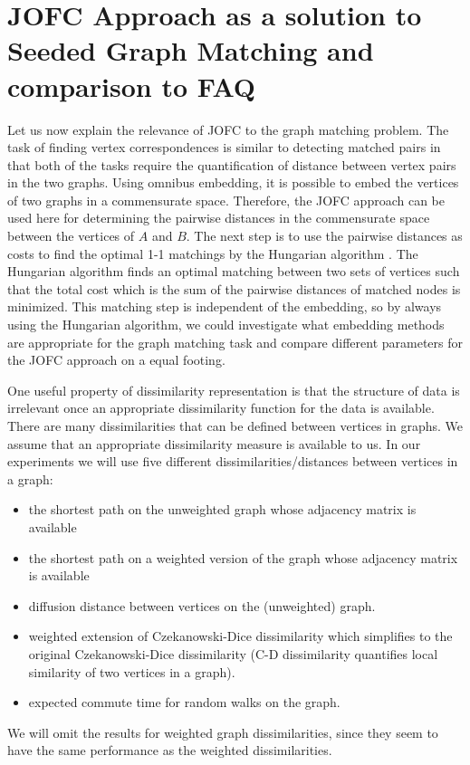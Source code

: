 \documentclass[12pt,oneside,final]{thesis}\usepackage[]{graphicx}\usepackage[]{color}
\begin{document}
\chapter{JOFC Approach as a solution to Seeded Graph Matching and comparison to FAQ}
\label{sec:sgm-jofc}


Let us now explain the relevance of JOFC to the graph matching problem. The  task of finding vertex correspondences is similar to  detecting matched pairs in that both of the tasks require the quantification of distance between vertex pairs  in the two graphs.
Using omnibus  embedding, it is possible to embed the vertices of two graphs in a commensurate space.
Therefore, the JOFC approach can be used here for determining the pairwise distances in the commensurate space between  the vertices of $A$ and $B$.
The next step is to use the pairwise distances as costs to find the optimal 1-1 matchings by the Hungarian algorithm \cite{Hung-algo}. The Hungarian algorithm finds an optimal matching between two sets of vertices such that the total  cost which is the sum of the pairwise distances of matched nodes is minimized. This matching step is independent of the embedding, so by always using the Hungarian algorithm, we could investigate what embedding methods are appropriate for the graph matching task and compare  different parameters for the JOFC approach on a equal footing.

 
One useful property of dissimilarity representation is that the structure of data is irrelevant once an appropriate dissimilarity function  for the data is available. 
There are many dissimilarities that can be defined between vertices in graphs. We assume that an appropriate dissimilarity measure is available to us.
In our experiments we will use five different dissimilarities/distances between vertices in a graph:
\begin{itemize}
 \item the shortest path on the  unweighted graph whose adjacency matrix is available
 \item the shortest path on a weighted version of the graph whose adjacency matrix is available
 \item diffusion distance between vertices on the (unweighted) graph.
 \item weighted extension of Czekanowski-Dice dissimilarity\cite{DICE,weightedDICE} which simplifies to the original Czekanowski-Dice dissimilarity (C-D dissimilarity  quantifies local similarity of two vertices in a graph).
 \item expected commute time for random walks on the graph.
 \end{itemize}
 We will omit the results for weighted graph dissimilarities, since they seem to have the same performance as the weighted dissimilarities.
 
\end{document}
